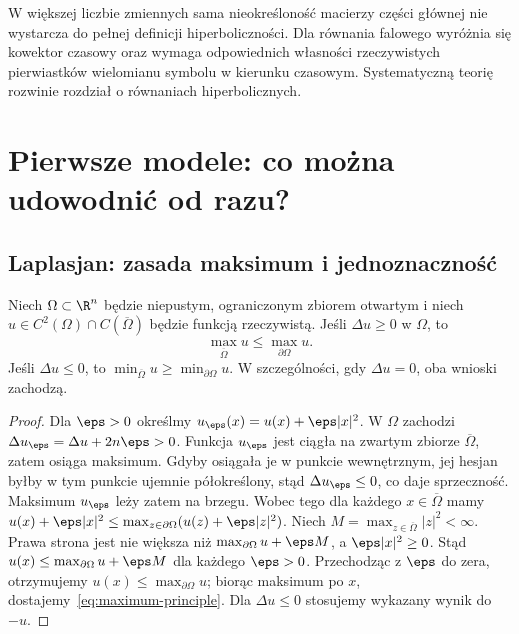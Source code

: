 W większej liczbie zmiennych sama nieokreśloność macierzy
części głównej nie wystarcza do pełnej definicji
hiperboliczności. Dla równania falowego wyróżnia się
kowektor czasowy oraz wymaga odpowiednich własności
rzeczywistych pierwiastków wielomianu symbolu w kierunku
czasowym. Systematyczną teorię rozwinie rozdział o
równaniach hiperbolicznych.

\section{Pierwsze modele: co można udowodnić od razu?}
\label{sec:pde-models}

\subsection{Laplasjan: zasada maksimum i jednoznaczność}

\begin{twierdzenie}
\label{thm:laplace-max}
Niech $\Omega\subset\R^n$ będzie niepustym, ograniczonym
zbiorem otwartym i niech $u\in C^2(\Omega)\cap
C(\overline\Omega)$ będzie funkcją rzeczywistą. Jeśli
$\Delta u\geq0$ w $\Omega$, to
\begin{equation}\label{eq:maximum-principle}
 \max_{\overline\Omega}u\leq\max_{\partial\Omega}u.
\end{equation}
Jeśli $\Delta u\leq0$, to
$\min_{\overline\Omega}u\geq\min_{\partial\Omega}u$.
W szczególności, gdy $\Delta u=0$, oba wnioski zachodzą.
\end{twierdzenie}
\begin{proof}
Dla $\eps>0$ określmy $u_\eps(x)=u(x)+\eps|x|^2$.
W $\Omega$ zachodzi
$\Delta u_\eps=\Delta u+2n\eps>0$.
Funkcja $u_\eps$ jest ciągła na zwartym zbiorze
$\overline\Omega$, zatem osiąga maksimum. Gdyby osiągała
je w punkcie wewnętrznym, jej hesjan byłby w tym punkcie
ujemnie półokreślony, stąd $\Delta u_\eps\leq0$,
co daje sprzeczność. Maksimum $u_\eps$ leży zatem na brzegu.
Wobec tego dla każdego $x\in\overline\Omega$ mamy
$u(x)+\eps|x|^2\leq
\max_{z\in\partial\Omega}(u(z)+\eps|z|^2)$.
Niech $M=\max_{z\in\overline\Omega}|z|^2<\infty$.
Prawa strona jest nie większa niż
$\max_{\partial\Omega}u+\eps M$, a $\eps|x|^2\geq0$.
Stąd $u(x)\leq\max_{\partial\Omega}u+\eps M$ dla każdego
$\eps>0$. Przechodząc z $\eps$ do zera, otrzymujemy
$u(x)\leq\max_{\partial\Omega}u$; biorąc maksimum po $x$,
dostajemy~\eqref{eq:maximum-principle}.
Dla $\Delta u\leq0$ stosujemy wykazany wynik do $-u$.
\end{proof}

